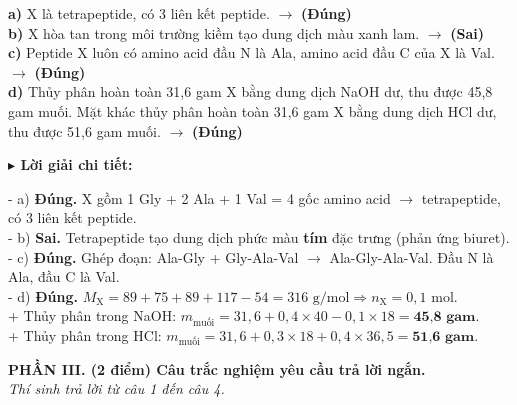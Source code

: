 \documentclass[11pt,a4paper]{article}
\newcommand{\loigiai}[1]{
    \par\vspace{2pt}
    \begingroup\leftskip=12pt
    \textcolor{solBlue}{\textbf{$\blacktriangleright$ Lời giải chi tiết:}}\par
    \small #1
    \par\endgroup\vspace{3pt}
}
\begin{document}
\quad \textbf{a)} X là tetrapeptide, có 3 liên kết peptide. \quad $\to$ \textbf{\color{ansRed}(Đúng)}\\[2pt]
\quad \textbf{b)} X hòa tan  trong môi trường kiềm tạo dung dịch màu xanh lam. \quad $\to$ \textbf{\color{ansRed}(Sai)}\\[2pt]
\quad \textbf{c)} Peptide X luôn có amino acid đầu N là Ala, amino acid đầu C của X là Val. \quad $\to$ \textbf{\color{ansRed}(Đúng)}\\[2pt]
\quad \textbf{d)} Thủy phân hoàn toàn 31,6 gam X bằng dung dịch NaOH dư, thu được 45,8 gam muối. Mặt khác thủy phân hoàn toàn 31,6 gam X bằng dung dịch HCl dư, thu được 51,6 gam muối. \quad $\to$ \textbf{\color{ansRed}(Đúng)}\\[2pt]
\loigiai{- a) \textbf{Đúng.} X gồm 1 Gly + 2 Ala + 1 Val = 4 gốc amino acid $\to$ tetrapeptide, có 3 liên kết peptide.\\
- b) \textbf{Sai.} Tetrapeptide tạo dung dịch phức màu \textbf{tím} đặc trưng (phản ứng biuret).\\
- c) \textbf{Đúng.} Ghép đoạn: Ala-Gly + Gly-Ala-Val $\to$ Ala-Gly-Ala-Val. Đầu N là Ala, đầu C là Val.\\
- d) \textbf{Đúng.} $M_{\text{X}} = 89 + 75 + 89 + 117 - 54 = 316\text{ g/mol} \Rightarrow n_{\text{X}} = 0,1\text{ mol}$.\\
+ Thủy phân trong NaOH: $m_{\text{muối}} = 31,6 + 0,4 \times 40 - 0,1 \times 18 = \textbf{45,8 gam}$.\\
+ Thủy phân trong HCl: $m_{\text{muối}} = 31,6 + 0,3 \times 18 + 0,4 \times 36,5 = \textbf{51,6 gam}$.}

\vspace{4pt}
\noindent\textbf{\large\color{mainGreen}PHẦN III. (2 điểm) Câu trắc nghiệm yêu cầu trả lời ngắn.}\\
\textit{Thí sinh trả lời từ câu 1 đến câu 4.}
\vspace{4pt}
\end{document}
